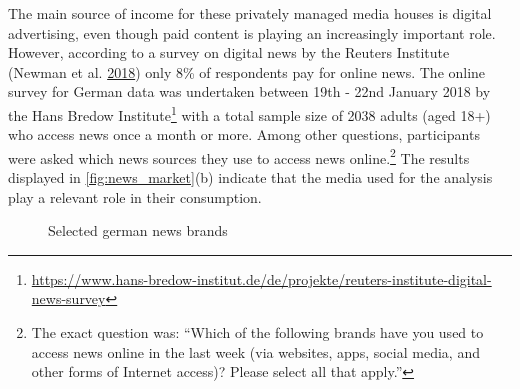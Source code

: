 \documentclass[
]{article}
\begin{document}
The main source of income for these privately managed media houses is
digital advertising, even though paid content is playing an increasingly
important role. However, according to a survey on digital news by the
Reuters Institute (Newman et al.
\protect\hyperlink{ref-newman_reuters_2018}{2018}) only 8\% of
respondents pay for online news. The online survey for German data was
undertaken between 19th - 22nd January 2018 by the Hans Bredow
Institute\footnote{\url{https://www.hans-bredow-institut.de/de/projekte/reuters-institute-digital-news-survey}}
with a total sample size of 2038 adults (aged 18+) who access news once
a month or more. Among other questions, participants were asked which
news sources they use to access news online.\footnote{The exact question
  was: ``Which of the following brands have you used to access news
  online in the last week (via websites, apps, social media, and other
  forms of Internet access)? Please select all that apply.''} The
results displayed in \autoref{fig:news_market}(b) indicate that the
media used for the analysis play a relevant role in their consumption.

\begin{figure}

{\centering {}

}

\caption{Selected german news brands \label{fig:news_market}}\label{fig:unnamed-chunk-1}
\end{figure}
\end{document}
